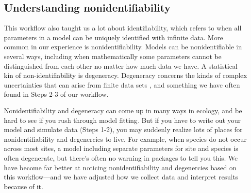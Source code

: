 \documentclass[11pt]{article}
\begin{document}

\subsection*{Understanding nonidentifiability}
This workflow also taught us a lot about identifiability, which refers to when all parameters in a model can be uniquely identified with infinite data. More common in our experience is nonidentifiability. Models can be nonidentifiable in several ways, including when mathematically some parameters cannot be distinguished from each other no matter how much data we have. 
A statistical kin of non-identifiability is degeneracy.  Degeneracy concerns the kinds of complex uncertainties that can arise from finite data sets \citep{gelmanhill}, and something we have often found in Steps 2-3 of our workflow.

Nonidentifiability and degeneracy can come up in many ways in ecology, and be hard to see if you rush through model fitting. But if you have to write out your model and simulate data (Steps 1-2), you may suddenly realize lots of places for nonidentifiability and degenercies to live. For example, when species do not occur across most sites, a model including separate parameters for site and species is often degenerate, but there's often no warning in packages to tell you this. We have become far better at noticing nonidentifiability and degenercies based on this workflow---and we have adjusted how we collect data and interpret results because of it. 
\end{document}
